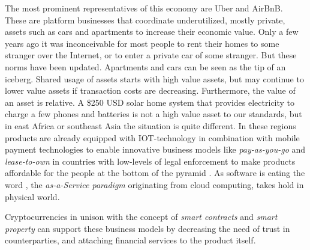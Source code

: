 The most prominent representatives of this economy are Uber and AirBnB. These are platform businesses that coordinate underutilized, mostly private, assets such as cars and apartments to increase their economic value. Only a few years ago it was inconceivable for most people to rent their homes to some stranger over the Internet, or to enter a private car of some stranger. But these norms have been updated. Apartments and cars can be seen as the tip of an iceberg. Shared usage of assets starts with high value assets, but may continue to lower value assets if transaction costs are decreasing. Furthermore, the value of an asset is relative. A \$250 USD solar home system that provides electricity to charge a few phones and batteries is not a high value asset to our standards, but in east Africa or southeast Asia the situation is quite different. In these regions products are already equipped with \ac{IOT}-technology in combination with mobile payment technologies to enable innovative business models like \emph{pay-as-you-go} and \emph{lease-to-own} in countries with low-levels of legal enforcement to make products affordable for the people at the bottom of the pyramid \parencite{ISI:000351842100012}. As software is eating the word \parencite{andreessen2011software}, the \emph{as-a-Service paradigm} originating from cloud computing, takes hold in physical world. 

Cryptocurrencies in unison with the concept of \emph{smart contracts} and \emph{smart property} \parencite{szabo1997,smartproperty2011} can support these business models by decreasing the need of trust in counterparties, and attaching financial services to the product itself.



